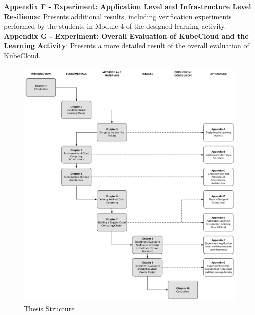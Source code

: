 \noindent\textbf{Appendix F - Experiment: Application Level and Infrastructure Level Resilience}: Presents additional results, including verification experiments performed by the students in Module 4 of the designed learning activity.\\

\noindent\textbf{Appendix G - Experiment: Overall Evaluation of KubeCloud and the Learning Activity}: Presents a more detailed result of the overall evaluation of KubeCloud. \\


\begin{figure}[H]
\centering
\includegraphics[width=13cm]{figures/thesis_structure}
\caption{Thesis Structure}
\label{fig:thesis_structure}
\end{figure}
